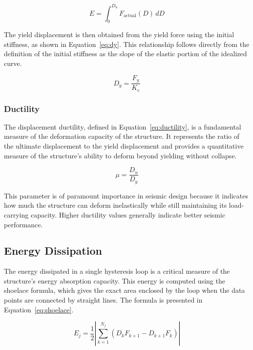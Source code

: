 \documentclass[11pt,a4paper]{article}
\begin{document}
\begin{equation}
E = \int_0^{D_u} F_{\text{actual}}(D) \, dD
\label{eq:energy_area}
\end{equation}

The yield displacement is then obtained from the yield force using the initial stiffness, as shown in Equation~\ref{eq:dy}. This relationship follows directly from the definition of the initial stiffness as the slope of the elastic portion of the idealized curve.

\begin{equation}
D_y = \frac{F_y}{K_e}
\label{eq:dy}
\end{equation}

\subsubsection{Ductility}

The displacement ductility, defined in Equation~\ref{eq:ductility}, is a fundamental measure of the deformation capacity of the structure. It represents the ratio of the ultimate displacement to the yield displacement and provides a quantitative measure of the structure's ability to deform beyond yielding without collapse.

\begin{equation}
\mu = \frac{D_u}{D_y}
\label{eq:ductility}
\end{equation}

This parameter is of paramount importance in seismic design because it indicates how much the structure can deform inelastically while still maintaining its load-carrying capacity. Higher ductility values generally indicate better seismic performance.

\subsection{Energy Dissipation}

The energy dissipated in a single hysteresis loop is a critical measure of the structure's energy absorption capacity. This energy is computed using the shoelace formula, which gives the exact area enclosed by the loop when the data points are connected by straight lines. The formula is presented in Equation~\ref{eq:shoelace}.

\begin{equation}
E_j = \frac{1}{2} \left| \sum_{k=1}^{N_j} (D_k F_{k+1} - D_{k+1} F_k) \right|
\label{eq:shoelace}
\end{equation}
\end{document}
